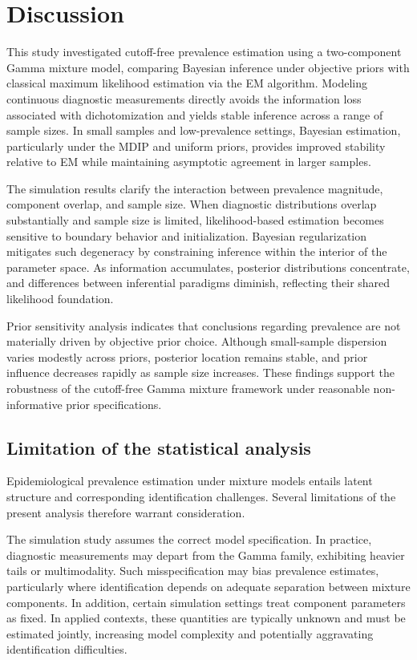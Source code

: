 \documentclass[11pt]{article}
\begin{document}
\section{Discussion}
This study investigated cutoff-free prevalence estimation using a two-component Gamma mixture model, comparing Bayesian inference under objective priors with classical maximum likelihood estimation via the EM algorithm. Modeling continuous diagnostic measurements directly avoids the information loss associated with dichotomization and yields stable inference across a range of sample sizes. In small samples and low-prevalence settings, Bayesian estimation, particularly under the MDIP and uniform priors, provides improved stability relative to EM while maintaining asymptotic agreement in larger samples.

The simulation results clarify the interaction between prevalence magnitude, component overlap, and sample size. When diagnostic distributions overlap substantially and sample size is limited, likelihood-based estimation becomes sensitive to boundary behavior and initialization. Bayesian regularization mitigates such degeneracy by constraining inference within the interior of the parameter space. As information accumulates, posterior distributions concentrate, and differences between inferential paradigms diminish, reflecting their shared likelihood foundation.

Prior sensitivity analysis indicates that conclusions regarding prevalence are not materially driven by objective prior choice. Although small-sample dispersion varies modestly across priors, posterior location remains stable, and prior influence decreases rapidly as sample size increases. These findings support the robustness of the cutoff-free Gamma mixture framework under reasonable non-informative prior specifications.

\subsection{Limitation of the statistical analysis}

Epidemiological prevalence estimation under mixture models entails latent structure and corresponding identification challenges. Several limitations of the present analysis therefore warrant consideration.

The simulation study assumes the correct model specification. In practice, diagnostic measurements may depart from the Gamma family, exhibiting heavier tails or multimodality. Such misspecification may bias prevalence estimates, particularly where identification depends on adequate separation between mixture components. In addition, certain simulation settings treat component parameters as fixed. In applied contexts, these quantities are typically unknown and must be estimated jointly, increasing model complexity and potentially aggravating identification difficulties.
\end{document}
